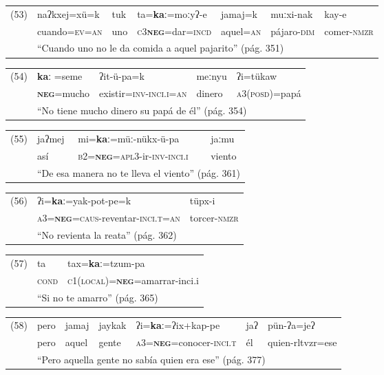 {\setmainfont{Charis SIL}

{\footnotesize
\noindent \begin{tabular}{lllllll}
(53) & naʔkxej=xü=k & tuk & ta=\textbf{kaː}=moːyʔ-e & jamaj=k & muːxi-nak & kay-e \\
& cuando=\textsc{ev=an} & uno & \textsc{c3\textbf{neg}}=dar=\textsc{incd} & aquel=\textsc{an} & pájaro-\textsc{dim} & comer-\textsc{nmzr} \\
& \multicolumn{6}{l}{``Cuando uno no le da comida a aquel pajarito'' (pág. 351)}
\end{tabular} \vspace{0.5cm}
}

\noindent \begin{tabular}{lllll}
(54) & \textbf{kaː} =seme & ʔit-ü-pa=k & meːnyu & ʔi=tükaw \\
& \textsc{\textbf{neg}}=mucho & existir=\textsc{inv-inci.i=an} & dinero & \textsc{a3(posd)}=papá \\
& \multicolumn{4}{l}{``No tiene mucho dinero su papá de él'' (pág. 354)}
\end{tabular} \vspace{0.5cm}

\noindent \begin{tabular}{llll}
(55) & jaʔmej & mi=\textbf{kaː}=müː-nükx-ü-pa & jaːmu \\
& así & \textsc{b2=\textbf{neg}=apl3}-ir-\textsc{inv-inci.i} & viento \\
& \multicolumn{3}{l}{``De esa manera no te lleva el viento'' (pág. 361)}
\end{tabular} \vspace{0.5cm}

\noindent \begin{tabular}{lll}
(56) & ʔi=\textbf{kaː}=yak-pot-pe=k & tüpx-i \\
& \textsc{a3=\textbf{neg}=caus}-reventar-\textsc{inci.t=an} & torcer-\textsc{nmzr}\\
& \multicolumn{2}{l}{``No revienta la reata'' (pág. 362)}
\end{tabular} \vspace{0.5cm}

\noindent \begin{tabular}{lll}
(57) & ta & tax=\textbf{kaː}=tzum-pa \\
& \textsc{cond} & \textsc{c1(local)=\textbf{neg}}=amarrar-inci.i \\
& \multicolumn{2}{l}{``Si no te amarro'' (pág. 365)}
\end{tabular} \vspace{0.5cm}

{\small
\noindent \begin{tabular}{lllllll}
(58) & pero & jamaj & jaykak & ʔi=\textbf{kaː}=ʔix+kap-pe & jaʔ & pün-ʔa=jeʔ \\
& pero & aquel & gente & \textsc{a3=\textbf{neg}=}conocer-\textsc{inci.t} & él & quien-rltvzr=ese \\
& \multicolumn{6}{l}{``Pero aquella gente no sabía quien era ese'' (pág. 377)}
\end{tabular} \vspace{0.5cm}
}}


